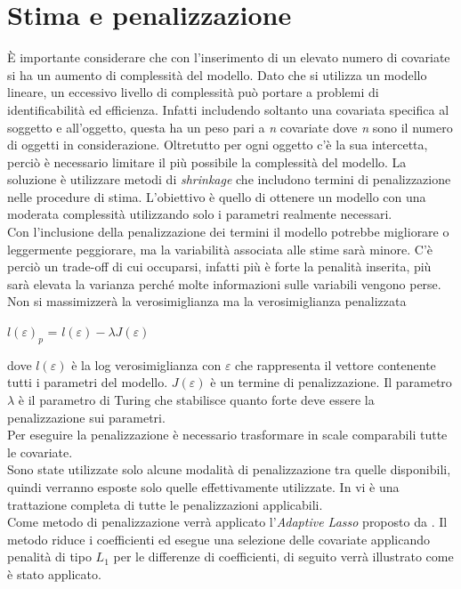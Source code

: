 \section{Stima e penalizzazione}
È importante considerare che con l'inserimento di un elevato numero di covariate si ha un aumento di complessità del modello. Dato che si utilizza un modello lineare, un eccessivo livello di complessità può portare a problemi di identificabilità ed efficienza. Infatti includendo soltanto una covariata specifica al soggetto e all'oggetto, questa ha un peso pari a \emph{n} covariate dove \emph{n} sono il numero di oggetti in considerazione. Oltretutto per ogni oggetto c'è la sua intercetta, perciò è necessario limitare il più possibile la complessità del modello. La soluzione è utilizzare metodi di \emph{shrinkage} che includono termini di penalizzazione nelle procedure di stima. L'obiettivo è quello di ottenere un modello con una moderata complessità utilizzando solo i parametri realmente necessari. \\
Con l'inclusione della penalizzazione dei termini il modello potrebbe migliorare o leggermente peggiorare, ma la variabilità associata alle stime sarà minore. C'è perciò un trade-off di cui occuparsi, infatti più è forte la penalità inserita, più sarà elevata la varianza perché molte informazioni sulle variabili vengono perse. Non si massimizzerà la verosimiglianza ma la verosimiglianza penalizzata 
\begin{center}
	$ l(\varepsilon)_{p}$ = $l(\varepsilon) - \lambda J(\varepsilon)$
\end{center}
dove $l(\varepsilon)$ è la log verosimiglianza con $\varepsilon$ che rappresenta il vettore contenente tutti i parametri del modello. $J(\varepsilon)$ è un termine di penalizzazione. Il parametro $\lambda$ è il parametro di Turing che stabilisce quanto forte deve essere la penalizzazione sui parametri. \\
Per eseguire la penalizzazione è necessario trasformare in scale comparabili tutte le covariate.\\
Sono state utilizzate solo alcune modalità di penalizzazione tra quelle disponibili, quindi verranno esposte solo quelle effettivamente utilizzate. In \autocite{schauberger2019btllasso} vi è una trattazione completa di tutte le penalizzazioni applicabili.\\
Come metodo di penalizzazione verrà applicato l'\emph{Adaptive Lasso} proposto da \autocite{zou2006}. Il metodo riduce i coefficienti ed esegue una selezione delle covariate applicando penalità di tipo $L_1$ per le differenze di coefficienti, di seguito verrà illustrato come è stato applicato.\\


